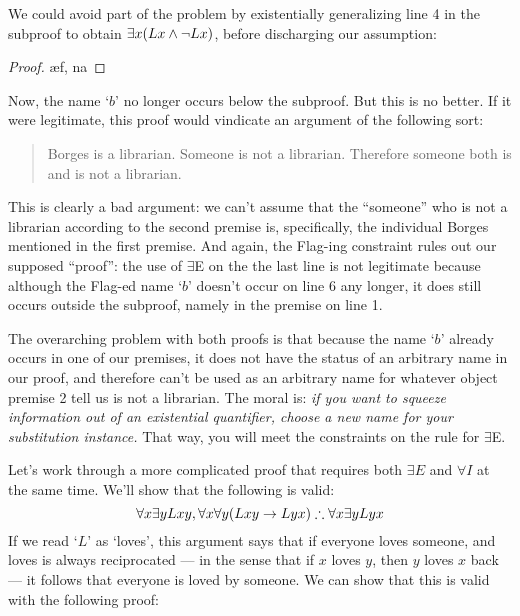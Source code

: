 We could avoid part of the problem by existentially generalizing line 4 in the subproof to obtain $\exists x(Lx \wedge \lnot Lx)$, before discharging our assumption:
\begin{proof}
	 
	 
	\open
		 
		\ae{f, na}
	\close
\end{proof}
Now, the name `$b$' no longer occurs below the subproof.  But this is no better.  If it were legitimate, this proof would vindicate an argument of the following sort:
\begin{quote}
Borges is a librarian. Someone is not a librarian.  Therefore someone both is and is not a librarian.	\end{quote}
This is clearly a bad argument: we can't assume that the ``someone'' who is not a librarian according to the second premise is, specifically, the individual Borges mentioned in the first premise.  And again, the Flag-ing constraint rules out our supposed ``proof'': the use of $\exists$E on the the last line is not legitimate because although the Flag-ed name `$b$' doesn't occur on line $6$ any longer, it does still occurs outside the subproof, namely in the premise on line 1.

The overarching problem with both proofs is that because the name `$b$' already occurs in one of our premises, it does not have the status of an arbitrary name in our proof, and therefore can't be used as an arbitrary name for whatever object premise 2 tell us is not a librarian.  The moral is: \emph{if you want to squeeze information out of an existential quantifier, choose a new name for your substitution instance.} That way, you will meet the constraints on the rule for $\exists$E.

Let's work through a more complicated proof that requires both $\exists E$ and $\forall I$ at the same time. We'll show that the following is valid:
$$\forall x\exists yLxy, \forall x \forall y(Lxy \rightarrow Lyx) \therefore \forall x\exists yLyx$$
If we read `$L$' as `loves', this argument says that if everyone loves someone, and loves is always reciprocated --- in the sense that if $x$ loves $y$, then $y$ loves $x$ back --- it follows that everyone is loved by someone.  We can show that this is valid with the following proof:

